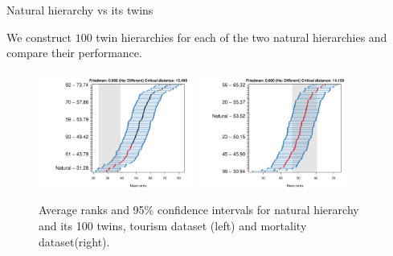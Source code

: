 \documentclass[aspectratio=169]{beamer}
\begin{document}
\begin{frame}{Natural hierarchy vs its twins}

We construct $100$ twin hierarchies for each of the two natural hierarchies and compare their performance.

\begin{figure}
	\centering
	\includegraphics[width=0.45\textwidth]{../manuscript/figures/hierarchy_rmsse/tourism/P2_natural_vs_pn_h12.pdf}
	\includegraphics[width=0.45\textwidth]{../manuscript/figures/hierarchy_rmsse/mortality/P2_natural_vs_pn_h12.pdf}
	\caption{Average ranks and 95\% confidence intervals for natural hierarchy and its 100 twins, tourism dataset (left) and mortality dataset(right).}
\end{figure}
	
\end{frame}
\end{document}

